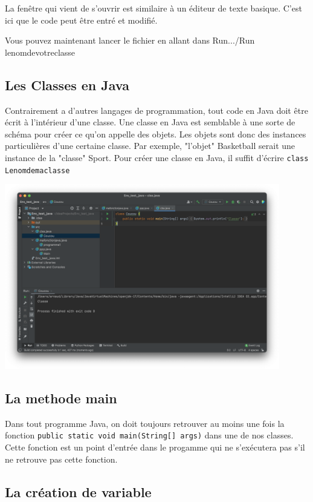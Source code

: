 La fenêtre qui vient de s'ouvrir est similaire à un éditeur de texte basique. C'est ici que le code peut être entré et modifié.

Vous pouvez maintenant lancer le fichier en allant dans Run.../Run lenomdevotreclasse

\subsection{Les Classes en Java}

Contrairement a d'autres langages de programmation, tout code en Java doit être écrit à l'intérieur d'une classe. Une classe en Java est semblable à une sorte de schéma pour créer ce qu'on appelle des objets. Les objets sont donc des instances particulières d'une certaine classe. Par exemple, "l'objet" Basketball serait une instance de la "classe" Sport. Pour créer une classe en Java, il suffit d'écrire \lstinline{class Lenomdemaclasse}

\begin{center}
	\includegraphics[width=12cm]{clss}	
\end{center}

\subsection{La methode main}
Dans tout programme Java, on doit toujours retrouver au moins une fois la fonction \lstinline{public static void main(String[] args)} dans une de nos classes. Cette fonction est un point d'entrée dans le progamme qui ne s'exécutera pas s'il ne retrouve pas cette fonction.
\subsection{La création de variable}

